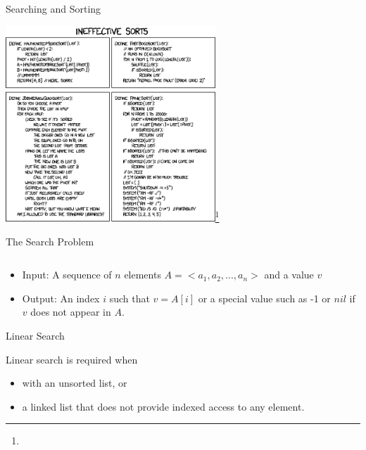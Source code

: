 \documentclass{beamer}
\author[Chris Simpkins] 
{Christopher Simpkins \\\texttt{chris.simpkins@gatech.edu}}
\institute[Georgia Tech] %
\date[CS 1331]{}
\begin{document}
\begin{frame}{Searching and Sorting}
\vspace{-.1in}
  \begin{center} \includegraphics[height=2.9in]{ineffective_sorts.png}\footnote{}
  \end{center}
\end{frame}



\begin{frame}[fragile]{The Search Problem}


\begin{lstlisting}[language=Java]

\end{lstlisting}

\begin{itemize}
\item Input: A sequence of $n$ elements $A = <a_1, a_2, ..., a_n>$ and a value $v$
\item Output: An index $i$ such that $v = A[i]$ or a special value such as -1 or $nil$ if $v$ does not appear in $A$.
\end{itemize}


\end{frame}


\begin{frame}[fragile]{Linear Search}


Linear search is required when
\begin{itemize}
\item with an unsorted list, or
\item a linked list that does not provide indexed access to any element.
\end{itemize}


\end{frame}
\end{document}
